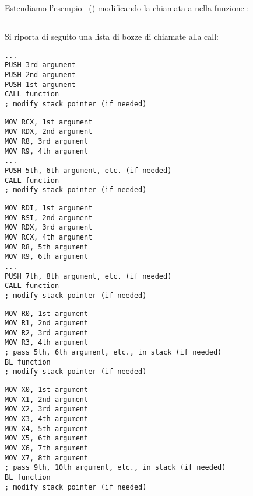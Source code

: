 \section{\PrintfSeveralArgumentsSectionName}

Estendiamo l'esempio \IT{\HelloWorldSectionName}~() modificando la chiamata a  \printf nella funzione \main:







\subsection{\Conclusion{}}

Si riporta di seguito una lista di bozze di chiamate alla call:

\begin{lstlisting}[caption=x86,style=customasmx86]
...
PUSH 3rd argument
PUSH 2nd argument
PUSH 1st argument
CALL function
; modify stack pointer (if needed)
\end{lstlisting}

\begin{lstlisting}[caption=x64 (MSVC),style=customasmx86]
MOV RCX, 1st argument
MOV RDX, 2nd argument
MOV R8, 3rd argument
MOV R9, 4th argument
...
PUSH 5th, 6th argument, etc. (if needed)
CALL function
; modify stack pointer (if needed)
\end{lstlisting}

\begin{lstlisting}[caption=x64 (GCC),style=customasmx86]
MOV RDI, 1st argument
MOV RSI, 2nd argument
MOV RDX, 3rd argument
MOV RCX, 4th argument
MOV R8, 5th argument
MOV R9, 6th argument
...
PUSH 7th, 8th argument, etc. (if needed)
CALL function
; modify stack pointer (if needed)
\end{lstlisting}

\begin{lstlisting}[caption=ARM,style=customasmARM]
MOV R0, 1st argument
MOV R1, 2nd argument
MOV R2, 3rd argument
MOV R3, 4th argument
; pass 5th, 6th argument, etc., in stack (if needed)
BL function
; modify stack pointer (if needed)
\end{lstlisting}

\begin{lstlisting}[caption=ARM64,style=customasmARM]
MOV X0, 1st argument
MOV X1, 2nd argument
MOV X2, 3rd argument
MOV X3, 4th argument
MOV X4, 5th argument
MOV X5, 6th argument
MOV X6, 7th argument
MOV X7, 8th argument
; pass 9th, 10th argument, etc., in stack (if needed)
BL function
; modify stack pointer (if needed)
\end{lstlisting}

